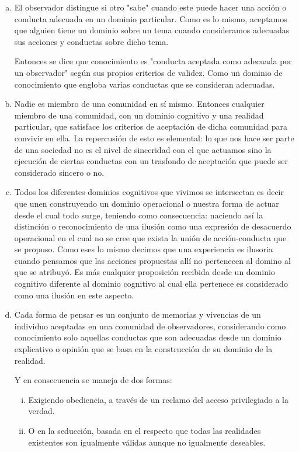 \documentclass[10pt]{article}
\begin{document}
        \begin{enumerate}[a)]
            \item El observador distingue si otro "sabe" cuando este puede hacer una acción o conducta adecuada en un dominio particular. Como es lo mismo, aceptamos que alguien tiene un dominio sobre un tema cuando consideramos adecuadas sus acciones y conductas sobre dicho tema.
            
            Entonces se dice que conocimiento es "conducta aceptada como adecuada por un observador" según sus propios criterios de validez. Como un dominio de conocimiento que engloba varias conductas que se consideran adecuadas.

            \item  Nadie es miembro de una comunidad en sí mismo. Entonces cualquier miembro de una comunidad, con un dominio cognitivo y una realidad particular, que satisface los criterios de aceptación de dicha comunidad para convivir en ella. La repercusión de esto es elemental: lo que nos hace ser parte de una sociedad no es el nivel de sinceridad con el que actuamos sino la ejecución de ciertas conductas con un trasfondo de aceptación que puede ser considerado sincero o no.
            \item Todos los diferentes dominios cognitivos que vivimos se intersectan es decir que unen construyendo un dominio operacional o nuestra forma de actuar desde el cual todo surge, teniendo como consecuencia: naciendo así la distinción o reconocimiento de una ilusión como una expresión de desacuerdo operacional en el cual no se cree que exista la unión de acción-conducta que se propuso. Como eses lo mismo decimos que una experiencia es ilusoria cuando pensamos que las acciones  propuestas allí no pertenecen al domino al que se atribuyó. Es más cualquier proposición recibida desde un dominio cognitivo diferente  al dominio cognitivo al cual ella pertenece es considerado como una ilusión en este aspecto.
            \item Cada forma de pensar es un conjunto de memorias y vivencias de un individuo aceptadas en una comunidad de observadores, considerando como conocimiento solo aquellas conductas que son adecuadas desde un dominio explicativo o opinión que se basa en la construcción de su dominio de la realidad. 

            Y en consecuencia se maneja de dos formas:

            \begin{enumerate}[i.]
                \item Exigiendo obediencia, a través de un reclamo del acceso privilegiado a la verdad.
                \item O en la seducción, basada en el respecto que todas las realidades existentes son igualmente válidas aunque no igualmente deseables.
            \end{enumerate}


\end{enumerate}
\end{document}
